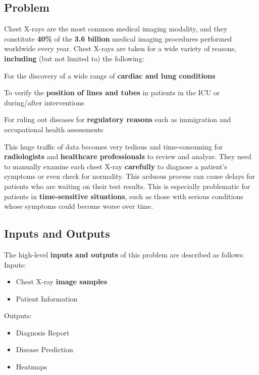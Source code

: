 \documentclass{article}
\begin{document}
\subsection{Problem}

Chest X-rays are the most common medical imaging modality, and they constitute \textbf{40\%} of the \textbf{3.6 billion} medical imaging procedures performed worldwide every year.
Chest X-rays are taken for a wide variety of reasons, \textbf{including} (but not limited to) the following:

\begin{itemize}
\begin{item}
For the discovery of a wide range of \textbf{cardiac and lung conditions}
\end{item}
\begin{item}
To verify the \textbf{position of lines and tubes} in patients in the ICU or during/after interventions
\end{item}
\begin{item}
For ruling out diseases for \textbf{regulatory reasons} such as immigration and occupational health assessments
\end{item}
\end{itemize}

\noindent This huge traffic of data becomes very tedious and time-consuming for \textbf{radiologists} and \textbf{healthcare professionals} to review and analyze.
They need to manually examine each chest X-ray \textbf{carefully} to diagnose a patient’s symptoms or even check for normality.
This arduous process can cause delays for patients who are waiting on their test results.
This is especially problematic for patients in \textbf{time-sensitive situations}, such as those with serious conditions whose symptoms could become worse over time.

\subsection{Inputs and Outputs}

The high-level \textbf{inputs and outputs} of this problem are described as follows:\\
Inputs:
\begin{itemize}
\item Chest X-ray \textbf{image samples}
\item Patient Information
\end{itemize}

\noindent Outputs:
\begin{itemize}
\item Diagnosis Report
\item Disease Prediction
\item Heatmaps
\end{itemize} 
\end{document}
